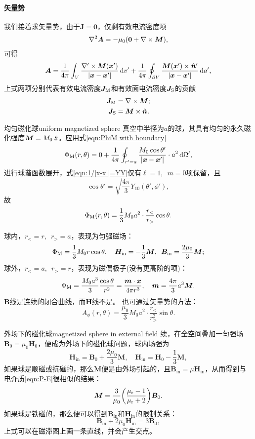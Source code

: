 \paragraph{矢量势}
我们接着求矢量势，由于$\bm J=\bm 0$，仅剩有效电流密度项
\begin{equation}
    \nabla^2\bm A=-\mu_0(\bm 0+\nabla\times\bm M),
\end{equation}
可得
\begin{equation}
    \label{eqn:A with boundary}
    \bm A=\frac1{4\pi}\int_V\frac{\nabla'\times\bm M(\bm x')}{|\bm x-\bm x'|}\mathop{}\!\mathrm{d} v'+\frac1{4\pi}\oint_{\partial V}\frac{\bm M(\bm x')\times\mathop{}\!\hat{\bm{n}}'}{|\bm x-\bm x'|}\mathop{}\!\mathrm{d} a',
\end{equation}
上式两项分别代表有效电流密度$\bm J_\text M$和有效面电流密度$\bm J_\text S$的贡献
\begin{align}
    \bm J_\text M&=\nabla\times\bm M;\\
    \bm J_\text S&=\bm M\times\mathop{}\!\hat{\bm{n}}.
\end{align}
\begin{example}{均匀磁化球}{uniform magnetized sphere}
    真空中半径为$a$的球，其具有均匀的永久磁化强度$\bm M=M_0\mathop{}\!\hat{\bm{z}}$。应用式\eqref{eqn:PhiM with boundary}
    \[
        \Phi_\text M(r,\theta)=0+\frac1{4\pi}\oint_{r'=a}\frac{M_0\cos\theta'}{|\bm x-\bm x'|}\cdot a^2\mathop{}\!\mathrm{d}\Omega',
    \]
    进行球谐函数展开，式\eqref{eqn:1/|x-x'|=YY}仅有$\ell=1,\enspace m=0$项保留，且
    \[
        \cos\theta'=\sqrt{\frac{4\pi}3}Y_{10}(\theta',\phi'),
    \]
    故
    \[
        \Phi_\text M(r,\theta)=\frac13M_0a^2\cdot\frac{r_<}{r_>}\cos\theta.
    \]

    球内，$r_<=r,\enspace r_>=a$，表现为匀强磁场：
    \[
        \Phi_\text M=\frac13M_0r\cos\theta,\quad \bm H_\text{in}=-\frac13\bm M,\enspace\bm B_\text{in}=\frac{2\mu_0}3\bm M;
    \]
    球外，$r_<=a,\enspace r_>=r$，表现为磁偶极子(没有更高阶的项)：
    \[
        \Phi_\text M=\frac{M_0a^3}3\frac{\cos\theta}{r^2}=\frac{\bm m\cdot\bm x}{4\pi r^3},\quad\bm m=\frac{4\pi}3a^3\bm M.
    \]
    $\bm B$线是连续的闭合曲线，而$\bm H$线不是。
    \tcblower
    也可通过矢量势的方法：
    \[
        A_\phi(r,\theta)=\frac{\mu_0}3M_0a^2\cdot\frac{r_<}{r_>^2}\sin\theta.
    \]
\end{example}
\begin{example}{外场下的磁化球}{magnetized sphere in external field}
    续，在全空间叠加一匀强场$\bm B_0=\mu_0\bm H_0$，便成为外场下的磁化球问题，球内场强为
    \[
        \bm H_\text{in}=\bm B_0+\frac{2\mu_0}3\bm M,\quad\bm H_\text{in}=\bm H_0-\frac13\bm M,
    \]
    如果球是顺磁或抗磁的，那么$\bm M$便是由外场引起的，且$\bm B_\text{in}=\mu\bm H_\text{in}$，从而得到与电介质\eqref{eqn:P-E}很相似的结果：
    \begin{equation}
        \label{eqn:M-B}
        \bm M=\frac3{\mu_0}\biggl(\frac{\mu_\text r-1}{\mu_\text r+2}\biggr)\bm B_0.
    \end{equation}
    如果球是铁磁的，那么便可以得到$\bm B_\text{in}$和$\bm H_\text{in}$的限制关系：
    \[
        \bm B_\text{in}+2\mu_0\bm H_\text{in}=3\bm B_0,
    \]
    上式可以在磁滞图上画一条直线，并会产生交点。
\end{example}
